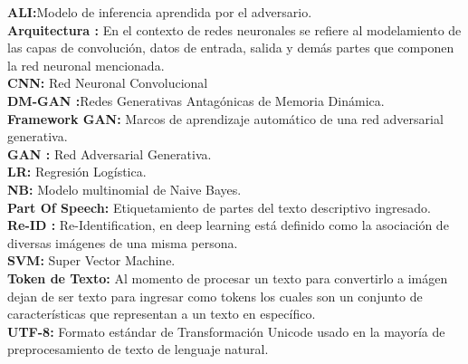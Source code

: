 \textbf{ALI:}Modelo de inferencia aprendida por el adversario.\\
\textbf{Arquitectura :} En el contexto de redes neuronales se refiere al modelamiento de las capas de convolución, datos de entrada, salida y demás partes que componen la red neuronal mencionada.\\
\textbf{CNN:} Red Neuronal Convolucional\\
\textbf{DM-GAN :}Redes Generativas Antagónicas de Memoria Dinámica.\\
\textbf{Framework GAN:} Marcos de aprendizaje automático de una red adversarial generativa.\\
\textbf{GAN :} Red Adversarial Generativa.\\ 
\textbf{LR:} Regresión Logística.\\
\textbf{NB:} Modelo multinomial de Naive Bayes.\\
\textbf{Part Of Speech:} Etiquetamiento de partes del texto descriptivo ingresado.\\
\textbf{Re-ID :} Re-Identification, en deep learning está definido como la asociación de diversas imágenes de una misma persona.\\
\textbf{SVM:} Super Vector Machine.\\
\textbf{Token de Texto:} Al momento de procesar un texto para convertirlo a imágen dejan de ser texto para ingresar como tokens los cuales son un conjunto de características que representan a un texto en específico.\\
\textbf{UTF-8:} Formato estándar de Transformación Unicode usado en la mayoría de preprocesamiento de texto de lenguaje natural.

